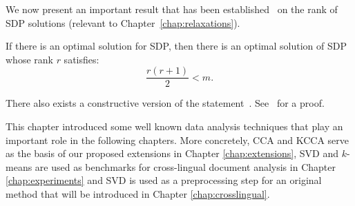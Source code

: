 We now present an important result that has been established~\cite{barvinok} on the rank of SDP solutions (relevant to Chapter~\ref{chap:relaxations}).
\begin{theorem}\label{sdpRankTheorem}
If there is an optimal solution for SDP, then there is an optimal solution of SDP whose rank $r$ satisfies:
$$\frac{r(r+1)}{2} < m.$$
\end{theorem}
There also exists a constructive version of the statement~\cite{Alfakih}. See~\cite[Chapter~6.5]{Luenberger} for a proof.

\vspace{5mm}
This chapter introduced some well known data analysis techniques that play an important role in the following chapters. More concretely, CCA and KCCA
serve as the basis of our proposed extensions in Chapter \ref{chap:extensions}, SVD and $k$-means are used as benchmarks for cross-lingual document
analysis in Chapter \ref{chap:experiments} and SVD is used as a preprocessing step for an original method that will be introduced in Chapter \ref{chap:crosslingual}.

